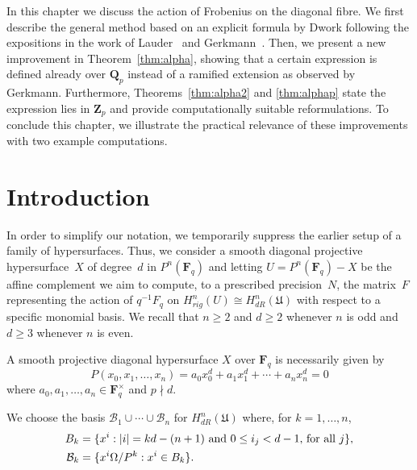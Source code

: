 
In this chapter we discuss the action of Frobenius on the diagonal fibre. 
We first describe the general method based on an explicit formula by Dwork 
following the expositions in the work of Lauder~\citep[Section~6]{Lau04} 
and Gerkmann~\citep[Section~4.4]{Gerkmann2007}.  Then, we present a new 
improvement in Theorem~\ref{thm:alpha}, showing that a certain 
expression is defined already over $\mathbf{Q}_p$ instead of a ramified 
extension as observed by Gerkmann.  Furthermore, Theorems~\ref{thm:alpha2} 
and \ref{thm:alphap} state the expression lies in $\mathbf{Z}_p$ and 
provide computationally suitable reformulations.  To conclude this chapter, 
we illustrate the practical relevance of these improvements with two example 
computations.


\section{Introduction}

In order to simplify our notation, we temporarily suppress the earlier 
setup of a family of hypersurfaces.
Thus, we consider a smooth diagonal projective hypersurface~$X$ of degree~$d$ 
in $P^n(\mathbf{F}_q)$ and letting $U = P^n(\mathbf{F}_q) - X$ be the affine 
complement we aim to compute, to a prescribed precision~$N$, the matrix~$F$ 
representing the action of $q^{-1} F_q$ on 
$H_{rig}^n(U) \cong H_{dR}^n(\mathfrak{U})$ with respect to a specific 
monomial basis.  We recall that $n \geq 2$ and $d \geq 2$ whenever $n$ is odd 
and $d \geq 3$ whenever $n$ is even.

A smooth projective diagonal hypersurface $X$ over $\mathbf{F}_q$ 
is necessarily given by 
\begin{equation*}
P(x_0, x_1, \dotsc, x_n) = a_0 x_0^d + a_1 x_1^d + \dotsb + a_n x_n^d = 0
\end{equation*}
where $a_0, a_1, \dotsc, a_n \in \mathbf{F}_q^{\times}$ and $p \nmid d$.

We choose the basis $\mathcal{B}_1 \cup \dotsb \cup \mathcal{B}_n$ 
for $H_{dR}^n(\mathfrak{U})$ where, for $k = 1, \dotsc, n$, 
\begin{align*}
B_k & = \{ x^i : \text{$\lvert i\rvert = kd - (n+1)$ and $0 \leq i_j < d-1$, for all $j$} \}, \\
\mathcal{B}_k & = \{x^i \Omega / P^k : x^i \in B_k \}.
\end{align*}

